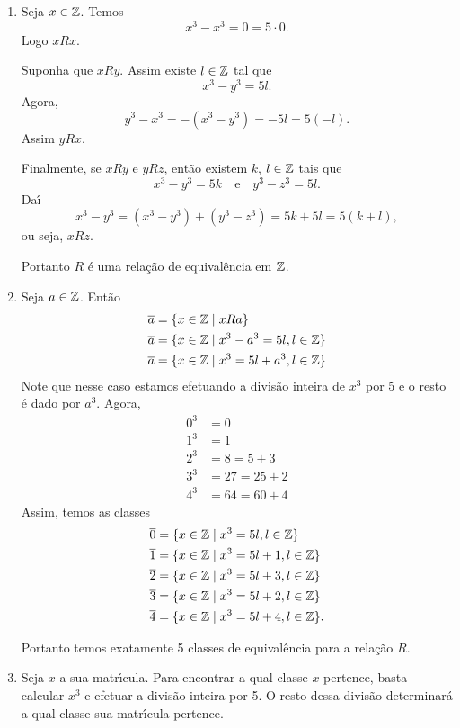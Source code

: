 \documentclass[12pt]{exam}
\begin{document}
	\begin{enumerate}[label={\arabic*})]
		\item Seja $x \in \mathbb{Z}$. Temos
		\[
			x^3 - x^3 = 0 = 5\cdot 0.
		\]
		Logo $xRx$.

		Suponha que $xRy$. Assim existe $l \in \mathbb{Z}$ tal que
		\[
			x^3 - y^3 = 5l.
		\]
		Agora,
		\[
			y^3 - x^3 = -(x^3 - y^3) = -5l = 5(-l).
		\]
		Assim $yRx$.

		Finalmente, se $xRy$ e $yRz$, ent\~ao existem $k$, $l \in \mathbb{Z}$ tais que
		\[
			x^3 - y^3 = 5k \quad \mbox{e} \quad y^3 - z^3 = 5l.
		\]
		Da{\'\i}
		\[
			x^3 - y^3 = (x^3 - y^3) + (y^3 - z^3) = 5k + 5l = 5(k + l),
		\]
		ou seja, $xRz$.

		Portanto $R$ \'e uma rela\c{c}\~ao de equival\^encia em $\mathbb{Z}$.

		\item Seja $a \in \mathbb{Z}$. Ent\~ao
		\begin{align*}
			\overline{a} &= \{x \in \mathbb{Z} \mid xRa\} \\
			\overline{a} &= \{x \in \mathbb{Z} \mid x^3 - a^3 = 5l, l \in \mathbb{Z}\}\\
			\overline{a} &= \{x \in \mathbb{Z} \mid x^3 = 5l + a^3, l \in \mathbb{Z}\}
		\end{align*}
		Note que nesse caso estamos efetuando a divis\~ao inteira de $x^3$ por 5 e o resto \'e dado por $a^3$.
		Agora,
		\begin{align*}
			0^3 &= 0\\
			1^3 &= 1\\
			2^3 &= 8 = 5 + 3\\
			3^3 &= 27 = 25 + 2\\
			4^3 &= 64 = 60 + 4
		\end{align*}
		Assim,
		temos as classes
		\begin{align*}
			\overline{0} &= \{x \in \mathbb{Z} \mid x^3 = 5l, l \in \mathbb{Z}\}\\
			\overline{1} &= \{x \in \mathbb{Z} \mid x^3 = 5l + 1, l \in \mathbb{Z}\}\\
			\overline{2} &= \{x \in \mathbb{Z} \mid x^3 = 5l + 3, l \in \mathbb{Z}\}\\
			\overline{3} &= \{x \in \mathbb{Z} \mid x^3 = 5l + 2, l \in \mathbb{Z}\}\\
			\overline{4} &= \{x \in \mathbb{Z} \mid x^3 = 5l + 4, l \in \mathbb{Z}\}.\\
		\end{align*}

		Portanto temos exatamente 5 classes de equival\^encia para a rela\c{c}\~ao $R$.

		\item Seja $x$ a sua matr{\'\i}cula. Para encontrar a qual classe $x$ pertence, basta calcular $x^3$ e efetuar a divis\~ao inteira por 5. O resto dessa divis\~ao determinar\'a a qual classe sua matr{\'\i}cula pertence.
	\end{enumerate}
\end{document}
